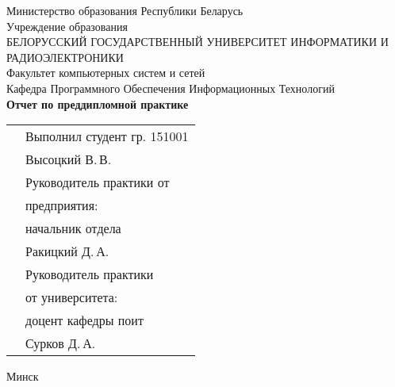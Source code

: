 \begin{titlepage}
    
    \begin{center}
        Министерство образования Республики Беларусь \\[0.4cm] 

        Учреждение образования \\

        \MakeUppercase{БЕЛОРУССКИЙ ГОСУДАРСТВЕННЫЙ УНИВЕРСИТЕТ ИНФОРМАТИКИ И РАДИОЭЛЕКТРОНИКИ} \\[0.4cm]

        Факультет компьютерных систем и сетей \\[0.4cm]

        Кафедра Программного Обеспечения Информационных Технологий \\[3.4cm] %

        {\large\bfseries{Отчет по преддипломной практике}} \\[2cm]

        \noindent
        \begin{tabular}{p{}p{}}
            & Выполнил студент гр. 151001 \\
            & Высоцкий В.\,В. \\[1cm]

            & Руководитель практики от \\
            & предприятия: \\
            & начальник отдела \\
            & Ракицкий Д.\,А. \\[1cm]

            & Руководитель практики \\
            & от университета: \\
            & доцент кафедры поит \\
            & Сурков Д.\,А. \\
        \end{tabular}

        \vfill

        {\normalsize Минск \currentYear{}}
    \end{center}

\end{titlepage}
